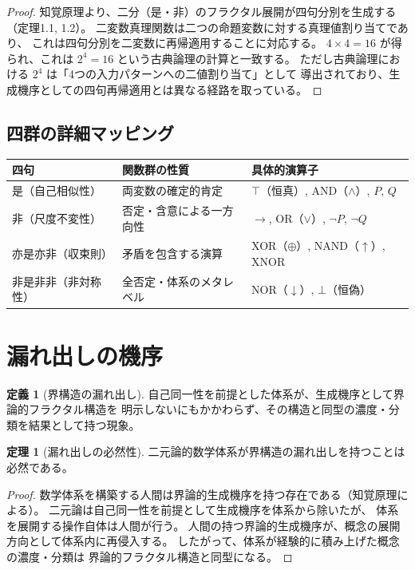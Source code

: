 \documentclass[11pt,a4paper]{article}
\theoremstyle{definition}
\newtheorem{definition}{定義}[section]
\newtheorem{theorem}{定理}[section]
\begin{document}
\begin{proof}
知覚原理より、二分（是・非）のフラクタル展開が四句分別を生成する（定理1.1, 1.2）。
二変数真理関数は二つの命題変数に対する真理値割り当てであり、
これは四句分別を二変数に再帰適用することに対応する。
$4 \times 4 = 16$ が得られ、これは $2^4 = 16$ という古典論理の計算と一致する。
ただし古典論理における $2^4$ は「4つの入力パターンへの二値割り当て」として
導出されており、生成機序としての四句再帰適用とは異なる経路を取っている。
\end{proof}

\subsection{四群の詳細マッピング}

\begin{center}
\renewcommand{\arraystretch}{1.3}
\begin{tabular}{llp{6cm}}
\toprule
四句 & 関数群の性質 & 具体的演算子 \\
\midrule
是（自己相似性） &
  両変数の確定的肯定 &
  $\top$（恒真）, AND（$\wedge$）, $P$, $Q$ \\
非（尺度不変性） &
  否定・含意による一方向性 &
  $\to$, OR（$\vee$）, $\neg P$, $\neg Q$ \\
亦是亦非（収束則） &
  矛盾を包含する演算 &
  XOR（$\oplus$）, NAND（$\uparrow$）, XNOR \\
非是非非（非対称性） &
  全否定・体系のメタレベル &
  NOR（$\downarrow$）, $\bot$（恒偽） \\
\bottomrule
\end{tabular}
\end{center}

\section{漏れ出しの機序}

\begin{definition}[界構造の漏れ出し]
自己同一性を前提とした体系が、生成機序として界論的フラクタル構造を
明示しないにもかかわらず、その構造と同型の濃度・分類を結果として持つ現象。
\end{definition}

\begin{theorem}[漏れ出しの必然性]
二元論的数学体系が界構造の漏れ出しを持つことは必然である。
\end{theorem}

\begin{proof}
数学体系を構築する人間は界論的生成機序を持つ存在である（知覚原理による）。
二元論は自己同一性を前提として生成機序を体系から除いたが、
体系を展開する操作自体は人間が行う。
人間の持つ界論的生成機序が、概念の展開方向として体系内に再侵入する。
したがって、体系が経験的に積み上げた概念の濃度・分類は
界論的フラクタル構造と同型になる。
\end{proof}
\end{document}
